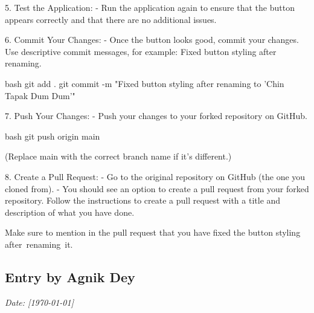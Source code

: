 \documentclass[a4paper,12pt]{article}
\begin{document}
5. Test the Application:
   - Run the application again to ensure that the button appears correctly and that there are no additional issues.\\
\vspace{1cm}

6. Commit Your Changes:
   - Once the button looks good, commit your changes. Use descriptive commit messages, for example: Fixed button styling after renaming.

   bash
   git add .
   git commit -m "Fixed button styling after renaming to 'Chin Tapak Dum Dum'"
   \\
\vspace{1cm}
   
7. Push Your Changes:
   - Push your changes to your forked repository on GitHub.

   bash
   git push origin main
   

   (Replace main with the correct branch name if it's different.)\\
\vspace{1cm}
   
8. Create a Pull Request:
   - Go to the original repository on GitHub (the one you cloned from).
   - You should see an option to create a pull request from your forked repository. Follow the instructions to create a pull request with a title and description of what you have done.

   Make sure to mention in the pull request that you have fixed the button styling after renaming it.




\newpage
{}
\vspace{-2cm}
\subsection*{Entry by Agnik Dey}
\textit{Date: [\today]}\\



\newpage
{}
\vspace{-2cm}
\end{document}
